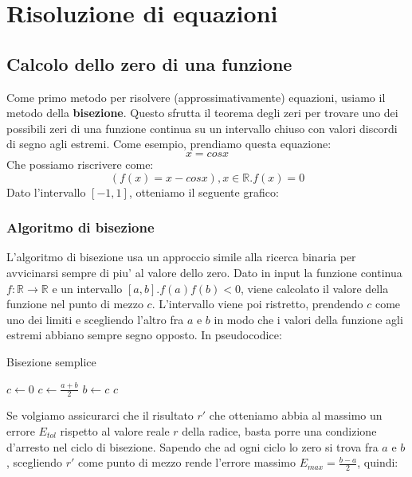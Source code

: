 \documentclass{report}
\begin{document}
\chapter{Risoluzione di equazioni}
\section{Calcolo dello zero di una funzione}
Come primo metodo per risolvere (approssimativamente) equazioni, usiamo il metodo della \textbf{bisezione}. Questo sfrutta il teorema degli zeri per trovare uno dei possibili zeri di una funzione continua su un intervallo chiuso con valori discordi di segno agli estremi. Come esempio, prendiamo questa equazione:
\[
x = cos x
\]
Che possiamo riscrivere come:
\[
  (f(x) = x-cos x), x \in \mathbb{R}. f(x) = 0
\]
Dato l'intervallo $ [-1, 1] $, otteniamo il seguente grafico:
\begin{figure}[h!]
  \centering
  
  \label{fig:func_og}
\end{figure}
\subsection{Algoritmo di bisezione}
L'algoritmo di bisezione usa un approccio simile alla ricerca binaria per avvicinarsi sempre di piu' al valore dello zero. Dato in input la funzione continua $ f:\mathbb{R}\to\mathbb{R} $ e un intervallo $ [a,b]. f(a)f(b)<0 $, viene calcolato il valore della funzione nel punto di mezzo $ c $. L'intervallo viene poi ristretto, prendendo $ c $ come uno dei limiti e scegliendo l'altro fra $ a $ e $ b $ in modo che i valori della funzione agli estremi abbiano sempre segno opposto. In pseudocodice:

\begin{algorithm}[H]
\caption{Bisezione semplice}
\SetAlgoLined
\SetNoFillComment
\vspace{3mm}
$c \leftarrow 0$\;
 {
    $ c \gets \frac{a+b}{2} $\;
     {
      $ b \gets c $
    }
}
\Return $ c $
\end{algorithm}

\vspace{3mm}
Se volgiamo assicurarci che il risultato $ r' $ che otteniamo abbia al massimo un errore $ E_{tol} $ rispetto al valore reale $ r $ della radice, basta porre una condizione d'arresto nel ciclo di bisezione. Sapendo che ad ogni ciclo lo zero si trova fra $ a $ e $ b $, scegliendo $ r' $ come punto di mezzo rende l'errore massimo $ E_{max} = \frac{b-a}{2} $, quindi:
\end{document}
